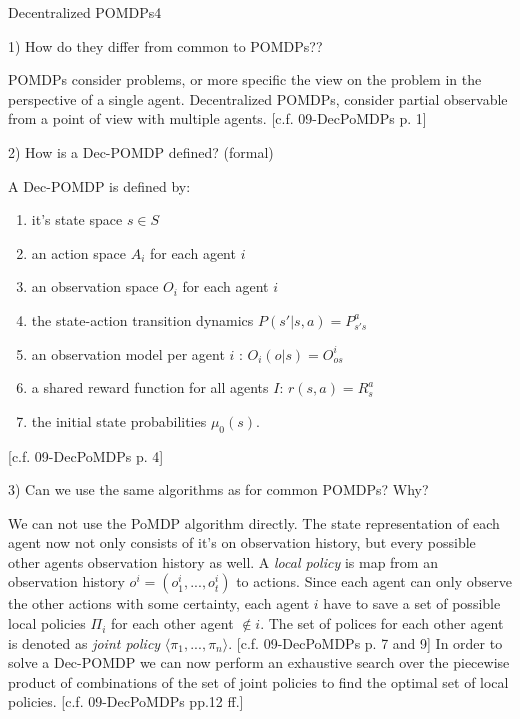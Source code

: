 \begin{questions}
\begin{question}{Decentralized POMDPs}{4}
	
	1) How do they differ from common to POMDPs??
	\begin{answer}
		
		POMDPs consider problems, or more specific the view on the problem in the perspective of a single agent.
		Decentralized POMDPs, consider partial observable from a point of view with multiple agents.
		[c.f. 09-DecPoMDPs p. 1]
	\end{answer}
	
	2) How is a Dec-POMDP defined? (formal)
	\begin{answer}
		
		A Dec-POMDP is defined by:
		\begin{enumerate}
			\item it's state space $ s \in S$
			\item an action space $A_i$ for each agent $i$
			\item an observation space $O_i$ for each agent $i$
			\item the state-action transition dynamics $P(s'|s,a) = P_{s' s}^a$
			\item an observation model per agent $i$ : $O_i(o|s) = O_{o s}^i$
			\item a shared reward function for all agents $I$: $r(s,a) = R_s^a$
			\item the initial state probabilities $\mu_0(s)$.
		\end{enumerate}
		[c.f. 09-DecPoMDPs p. 4]
	\end{answer}
	
	3) Can we use the same algorithms as for common POMDPs? Why?
	\begin{answer}
		
		We can not use the PoMDP algorithm directly. 
		The state representation of each agent now not only consists of it's on observation history, but every possible other agents observation history as well.
		A \textit{local policy} is map from an observation history $o^i = (o_1^i, ..., o_t^i)$ to actions.
		Since each agent can only observe the other actions with some certainty, each agent $i$ have to save a set of possible local policies $\Pi_i$ for each other agent $\not \in i$. The set of polices for each other agent is denoted as \textit{joint policy} $\langle \pi_1, ..., \pi_n \rangle$.
		[c.f. 09-DecPoMDPs p. 7 and 9]
		In order to solve a Dec-POMDP we can now perform an exhaustive search over the piecewise product of combinations of the set of joint policies to find the optimal set of local policies.
		[c.f. 09-DecPoMDPs pp.12 ff.]
	\end{answer}
	

\end{question}
\end{questions}
